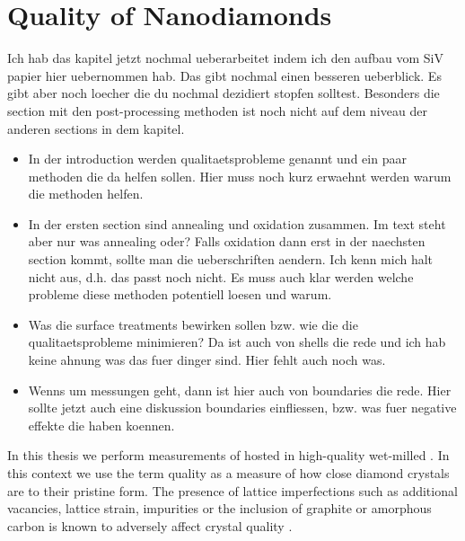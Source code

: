 
\chapter{Quality of Nanodiamonds}	\label{ch::crystal_quality}

		\begin{remark}
				Ich hab das kapitel jetzt nochmal ueberarbeitet indem ich den aufbau vom SiV papier hier uebernommen hab. Das gibt nochmal einen besseren ueberblick. Es gibt aber noch loecher die du nochmal dezidiert stopfen solltest. Besonders die section mit den post-processing methoden ist noch nicht auf dem niveau der anderen sections in dem kapitel.

				\begin{itemize}
					\item In der introduction werden qualitaetsprobleme genannt und ein paar methoden die da helfen sollen. Hier muss noch kurz erwaehnt werden warum die methoden helfen.
					\item In der ersten section sind annealing und oxidation zusammen. Im text steht aber nur was annealing oder? Falls oxidation dann erst in der naechsten section kommt, sollte man die ueberschriften aendern. Ich kenn mich halt nicht aus, d.h. das passt noch nicht. Es muss auch klar werden welche probleme diese methoden potentiell loesen und warum.
					\item Was die surface treatments bewirken sollen bzw. wie die die qualitaetsprobleme minimieren? Da ist auch von shells die rede und ich hab keine ahnung was das fuer dinger sind. Hier fehlt auch noch was.
					\item Wenns um \TEM messungen geht, dann ist hier auch von \nd boundaries die rede. Hier sollte jetzt auch eine diskussion boundaries einfliessen, bzw. was fuer negative effekte die haben koennen.
				\end{itemize}

		\end{remark}

		In this thesis we perform measurements of \sivs hosted in high-quality wet-milled \nds. In this context we use the term quality as a measure of how close diamond crystals are to their pristine form. The presence of lattice imperfections such as additional vacancies, lattice strain, impurities or the inclusion of graphite or amorphous carbon is known to adversely affect crystal quality \cite{Zaitsev2001,Prawer2004,Orwa2000}.

